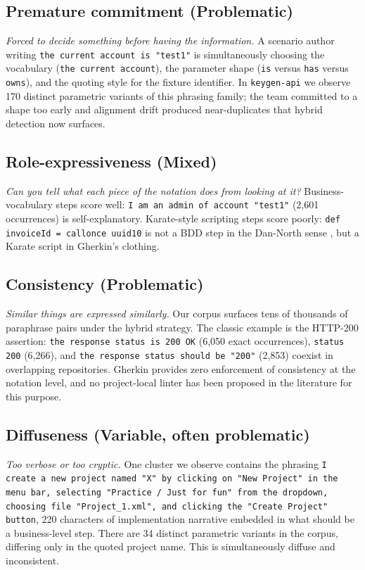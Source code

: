 \documentclass[11pt,a4paper]{article}
\begin{document}
\subsection{Premature commitment (Problematic)}
\textit{Forced to decide something before having the information.} A
scenario author writing \texttt{the current account is "test1"} is
simultaneously choosing the vocabulary (\texttt{the current account}),
the parameter shape (\texttt{is} versus \texttt{has} versus
\texttt{owns}), and the quoting style for the fixture identifier. In
\texttt{keygen-api} we observe 170 distinct parametric variants of
this phrasing family; the team committed to a shape too early and
alignment drift produced near-duplicates that hybrid detection now
surfaces.

\subsection{Role-expressiveness (Mixed)}
\textit{Can you tell what each piece of the notation does from looking
at it?} Business-vocabulary steps score well: \texttt{I am an admin of
account "test1"} (2{,}601 occurrences) is self-explanatory. Karate-style
\citep{karate2020} scripting steps score poorly: \texttt{def invoiceId
= callonce uuid10} is not a BDD step in the Dan-North sense
\citep{north2006bdd}, but a Karate script in Gherkin's clothing.

\subsection{Consistency (Problematic)}
\textit{Similar things are expressed similarly.} Our corpus surfaces
tens of thousands of paraphrase pairs under the hybrid strategy. The
classic example is the HTTP-200 assertion: \texttt{the response status
is 200 OK} (6{,}050 exact occurrences), \texttt{status 200} (6{,}266),
and \texttt{the response status should be "200"} (2{,}853) coexist in
overlapping repositories. Gherkin provides zero enforcement of
consistency at the notation level, and no project-local linter has
been proposed in the literature for this purpose.

\subsection{Diffuseness (Variable, often problematic)}
\textit{Too verbose or too cryptic.} One cluster we observe contains
the phrasing \texttt{I create a new project named "X" by clicking on
"New Project" in the menu bar, selecting "Practice / Just for fun"
from the dropdown, choosing file "Project\_1.xml", and clicking the
"Create Project" button}, 220 characters of implementation narrative
embedded in what should be a business-level step. There are 34 distinct
parametric variants in the corpus, differing only in the quoted project
name. This is simultaneously diffuse and inconsistent.
\end{document}
